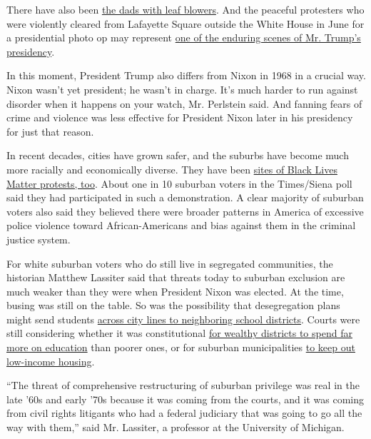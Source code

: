 There have also been
\href{https://www.oregonlive.com/news/2020/07/dad-with-leaf-blower-arrested-tuesday-says-he-was-taken-to-ground-by-federal-officers-during-portland-protest.html}{the
dads with leaf blowers}. And the peaceful protesters who were violently
cleared from Lafayette Square outside the White House in June for a
presidential photo op may represent
\href{https://www.nytimes.com/2020/06/02/us/politics/trump-walk-lafayette-square.html}{one
of the enduring scenes of Mr. Trump's presidency}.

In this moment, President Trump also differs from Nixon in 1968 in a
crucial way. Nixon wasn't yet president; he wasn't in charge. It's much
harder to run against disorder when it happens on your watch, Mr.
Perlstein said. And fanning fears of crime and violence was less
effective for President Nixon later in his presidency for just that
reason.

In recent decades, cities have grown safer, and the suburbs have become
much more racially and economically diverse. They have been
\href{https://www.bloomberg.com/news/features/2020-06-19/protests-for-racial-justice-take-root-in-suburbia}{sites
of Black Lives Matter protests, too}. About one in 10 suburban voters in
the Times/Siena poll said they had participated in such a demonstration.
A clear majority of suburban voters also said they believed there were
broader patterns in America of excessive police violence toward
African-Americans and bias against them in the criminal justice system.

For white suburban voters who do still live in segregated communities,
the historian Matthew Lassiter said that threats today to suburban
exclusion are much weaker than they were when President Nixon was
elected. At the time, busing was still on the table. So was the
possibility that desegregation plans might send students
\href{https://www.oyez.org/cases/1973/73-434}{across city lines to
neighboring school districts}. Courts were still considering whether it
was constitutional \href{https://www.oyez.org/cases/1972/71-1332}{for
wealthy districts to spend far more on education} than poorer ones, or
for suburban municipalities
\href{https://supreme.justia.com/cases/federal/us/402/137/}{to keep out
low-income housing}.

``The threat of comprehensive restructuring of suburban privilege was
real in the late '60s and early '70s because it was coming from the
courts, and it was coming from civil rights litigants who had a federal
judiciary that was going to go all the way with them,'' said Mr.
Lassiter, a professor at the University of Michigan.

